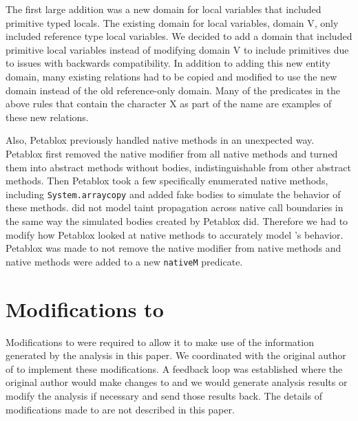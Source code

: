 The first large addition was a new domain for local variables that
included primitive typed locals. The existing domain for local
variables, domain V, only included reference type local variables. We
decided to add a domain that included primitive local variables
instead of modifying domain V to include primitives due to issues with
backwards compatibility. In addition to adding this new entity domain,
many existing relations had to be copied and modified to use the new
domain instead of the old reference-only domain. Many of the
predicates in the above rules that contain the character X as part of
the name are examples of these new relations.

Also, Petablox previously handled native methods in an unexpected
way. Petablox first removed the native modifier from all native
methods and turned them into abstract methods without bodies,
indistinguishable from other abstract methods. Then Petablox took a
few specifically enumerated native methods, including
\texttt{System.arraycopy} and added fake bodies to simulate the
behavior of these methods. \phosphor{} did not model taint propagation
across native call boundaries in the same way the simulated bodies
created by Petablox did. Therefore we had to modify how Petablox
looked at native methods to accurately model \phosphor{}'s
behavior. Petablox was made to not remove the native modifier from
native methods and native methods were added to a new \texttt{nativeM}
predicate.
\section{Modifications to \phosphor{}}
Modifications to \phosphor{} were required to allow it to make use of
the information generated by the analysis in this paper. We
coordinated with the original author of \phosphor{} to implement these
modifications. A feedback loop was established where the original
author would make changes to \phosphor{} and we would generate
analysis results or modify the analysis if necessary and send those
results back. The details of modifications made to \phosphor{} are not
described in this paper.
